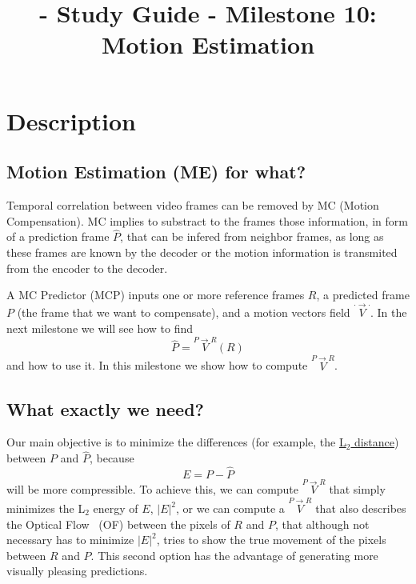 
\title{\SM{} - Study Guide - Milestone 10: Motion Estimation}

\maketitle

\section{Description}

\subsection{Motion Estimation (ME) for what?}
Temporal correlation between video frames can be removed by MC (Motion
Compensation). MC implies to substract to the frames those
information, in form of a prediction frame $\hat{P}$, that can be
infered from neighbor frames, as long as these frames are known by the
decoder or the motion information is transmited from the encoder to
the decoder.

A MC Predictor (MCP) inputs one or more reference frames $R$, a
predicted frame $P$ (the frame that we want to compensate), and a
motion vectors field $\overset{\cdot\rightarrow\cdot}{V}$. In the next
milestone we will see how to find
\begin{equation}
  \hat{P} =  \overset{P\rightarrow R}{V}(R)
\end{equation}
and how to use it. In this milestone we show how to compute
$\overset{P\rightarrow R}{V}$.

\subsection{What exactly we need?}
Our main objective is to minimize the differences (for example, the
\href{https://en.wikipedia.org/wiki/Euclidean_distance}{L$_2$
  distance}) between $P$ and $\hat{P}$, because
\begin{equation}
  E=P-\hat{P}
\end{equation}
will be more compressible. To achieve this, we can compute
$\overset{P\rightarrow R}{V}$ that simply minimizes the L$_2$ energy
of $E$, $|E|^2$, or we can compute a $\overset{P\rightarrow R}{V}$
that also describes the Optical Flow~\cite{horn1981determining} (OF)
between the pixels of $R$ and $P$, that although not necessary has to
minimize $|E|^2$, tries to show the true movement of the pixels
between $R$ and $P$. This second option has the advantage of generating
more visually pleasing predictions.

